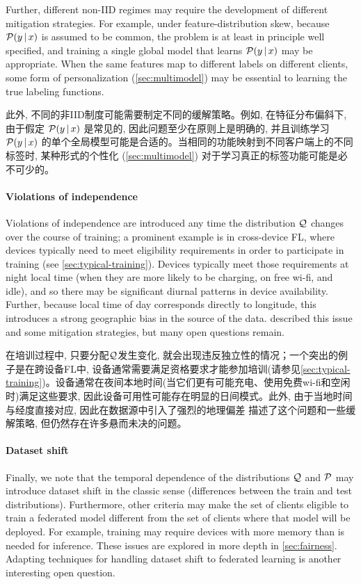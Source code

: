 Further, different non-IID regimes may require the development of different mitigation strategies. For example, under feature-distribution skew, because $\mathcal{P}(y \,|\, x)$ is assumed to be common, the problem is at least in principle well specified, and training a single global model that learns $\mathcal{P}(y \,|\, x)$ may be appropriate. When the same features map to different labels on different clients, some form of personalization (\cref{sec:multimodel}) may be essential to learning the true labeling functions.

此外, 不同的非IID制度可能需要制定不同的缓解策略。例如, 在特征分布偏斜下, 由于假定 $\mathcal{P}(y \,|\, x)$ 是常见的, 因此问题至少在原则上是明确的, 并且训练学习 $\mathcal{P}(y \,|\, x)$ 的单个全局模型可能是合适的。当相同的功能映射到不同客户端上的不同标签时, 某种形式的个性化 (\cref{sec:multimodel}) 对于学习真正的标签功能可能是必不可少的。

\paragraph{Violations of independence}
Violations of independence are introduced any time the distribution $\mathcal{Q}$ changes over the course of training; a prominent example is in cross-device FL, where devices typically need to meet eligibility requirements in order to participate in training (see \cref{sec:typical-training}). Devices typically meet those requirements at night local time (when they are more likely to be charging, on free wi-fi, and idle), and so there may be significant diurnal patterns in device availability. Further, because local time of day corresponds directly to longitude, this introduces a strong geographic bias in the source of the data. \citet{eichner19semicyclic} described this issue and some mitigation strategies, but many open questions remain.

在培训过程中, 只要分配$\mathcal{Q}$发生变化, 就会出现违反独立性的情况；一个突出的例子是在跨设备FL中, 设备通常需要满足资格要求才能参加培训(请参见\cref{sec:typical-training})。设备通常在夜间本地时间(当它们更有可能充电、使用免费wi-fi和空闲时)满足这些要求, 因此设备可用性可能存在明显的日间模式。此外, 由于当地时间与经度直接对应, 因此在数据源中引入了强烈的地理偏差 \citet{eichner19semicyclic} 描述了这个问题和一些缓解策略, 但仍然存在许多悬而未决的问题。


\paragraph{Dataset shift}
Finally, we note that the temporal dependence of the distributions $\mathcal{Q}$ and $\mathcal{P}$ may introduce dataset shift in the classic sense (differences between the train and test distributions). Furthermore, other criteria may make the set of clients eligible to train a federated model different from the set of clients where that model will be deployed.  For example, training may require devices with more memory than is needed for inference. These issues are explored in more depth in \cref{sec:fairness}. Adapting techniques for handling dataset shift to federated learning is another interesting open question.
  
